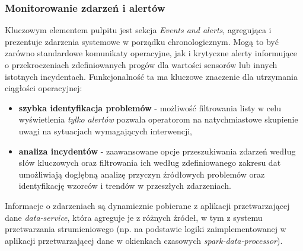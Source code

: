 \subsubsection{Monitorowanie zdarzeń i alertów}
Kluczowym elementem pulpitu jest sekcja \textit{Events and alerts}, agregująca i prezentuje zdarzenia systemowe w porządku chronologicznym. Mogą to być zarówno standardowe komunikaty operacyjne, jak i krytyczne alerty informujące o przekroczeniach zdefiniowanych progów dla wartości sensorów lub innych istotnych incydentach. Funkcjonalność ta ma kluczowe znaczenie dla utrzymania ciągłości operacyjnej:
\vspace{0.3em}
\begin{itemize}
    \item \textbf{szybka identyfikacja problemów} - możliwość filtrowania listy w celu wyświetlenia \textit{tylko alertów} pozwala operatorom na natychmiastowe skupienie uwagi na sytuacjach wymagających interwencji,
    \item \textbf{analiza incydentów} - zaawansowane opcje przeszukiwania zdarzeń według słów kluczowych oraz filtrowania ich według zdefiniowanego zakresu dat umożliwiają dogłębną analizę przyczyn źródłowych problemów oraz identyfikację wzorców i trendów w przeszłych zdarzeniach.
\end{itemize}
\vspace{0.3em}
Informacje o zdarzeniach są dynamicznie pobierane z aplikacji przetwarzającej dane \textit{data-service}, która agreguje je z różnych źródeł, w tym z systemu przetwarzania strumieniowego (np. na podstawie logiki zaimplementowanej w aplikacji przetwarzającej dane w okienkach czasowych \textit{spark-data-processor}).

